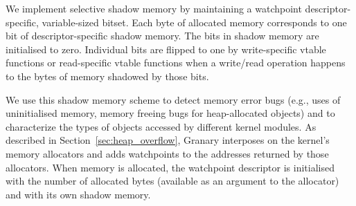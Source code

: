 
We implement selective shadow memory by maintaining a watchpoint descriptor-specific, variable-sized bitset. %
Each byte of allocated memory corresponds to one bit of descriptor-specific shadow memory. The bits in shadow memory are initialised to zero. Individual bits are flipped to one by write-specific vtable functions or read-specific vtable functions when a write/read operation happens to the bytes of memory shadowed by those bits. 

 



We use this shadow memory scheme to detect memory error bugs (e.g., uses of uninitialised memory, memory freeing bugs for heap-allocated objects) and to characterize the types of objects accessed by different kernel modules. As described in Section~\ref{sec:heap_overflow}, Granary interposes on the kernel's memory allocators and adds watchpoints to the addresses returned by those allocators. When memory is allocated, the watchpoint descriptor is initialised with the number of allocated bytes (available as an argument to the allocator) and with its own shadow memory. 


